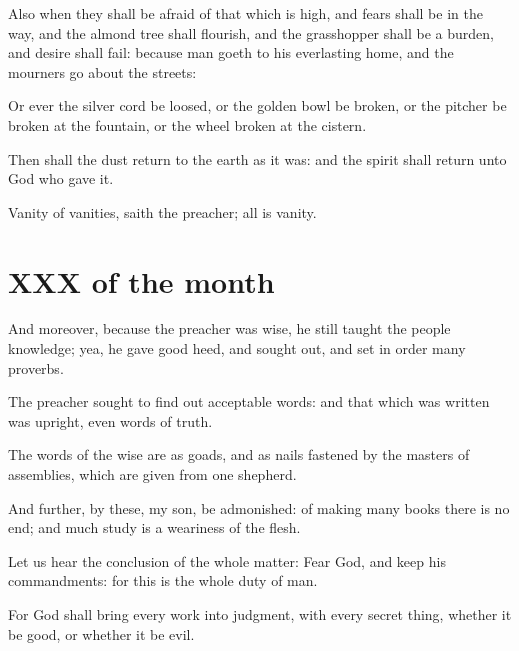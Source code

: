  Also when they shall be afraid of that which is high, and fears shall be in the way, and the almond tree shall flourish, and the grasshopper shall be a burden, and desire shall fail: because man goeth to his everlasting home, and the mourners go about the streets:

Or ever the silver cord be loosed, or the golden bowl be broken, or the pitcher be broken at the fountain, or the wheel broken at the cistern.

Then shall the dust return to the earth as it was: and the spirit shall return unto God who gave it.

Vanity of vanities, saith the preacher; all is vanity.

\section*{XXX of the month}

And moreover, because the preacher was wise, he still taught the people knowledge; yea, he gave good heed, and sought out, and set in order many proverbs.

The preacher sought to find out acceptable words: and that which was written was upright, even words of truth.

The words of the wise are as goads, and as nails fastened by the masters of assemblies, which are given from one shepherd.

And further, by these, my son, be admonished: of making many books there is no end; and much study is a weariness of the flesh.

Let us hear the conclusion of the whole matter: Fear God, and keep his commandments: for this is the whole duty of man.

For God shall bring every work into judgment, with every secret thing, whether it be good, or whether it be evil.
